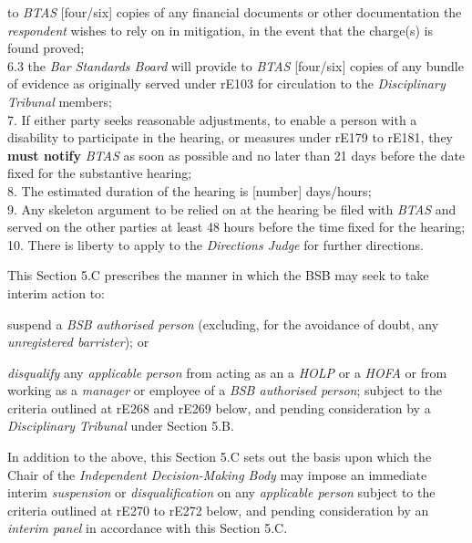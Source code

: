 to \emph{BTAS} {[}four/six{]} copies of any financial documents or other
documentation the \emph{respondent }wishes to rely on in mitigation, in
the event that the charge(s) is found proved;\\
6.3 the \emph{Bar Standards Board }will provide
to \emph{BTAS }{[}four/six{]} copies of any bundle of evidence as
originally served under rE103 for circulation to the \emph{Disciplinary
Tribunal }members;\\
7. If either party seeks reasonable adjustments, to enable a person with
a disability to participate in the hearing, or measures under rE179 to
rE181, they  \textcolor{myred}{\textbf{must notify}} \emph{BTAS }as soon as possible and no later
than 21 days before the date fixed for the substantive hearing;\\
8. The estimated duration of the hearing is {[}number{]} days/hours;\\
9. Any skeleton argument to be relied on at the hearing be filed
with \emph{BTAS} and served on the other parties at least 48 hours
before the time fixed for the hearing;\\
10. There is liberty to apply to the \emph{Directions Judge }for further
directions.\\
\par
{}
This Section 5.C prescribes the manner in which the BSB may seek to take
interim action to:\\\nl \item suspend a \emph{BSB authorised person }(excluding, for the avoidance
of doubt, any \emph{unregistered barrister}); or\item \emph{disqualify} any \emph{applicable person} from acting as an
a \emph{HOLP} or a \emph{HOFA} or from working as a \emph{manager} or
employee of a \emph{BSB authorised person};\ln
subject to the criteria outlined at rE268 and rE269 below, and pending
consideration by a \emph{Disciplinary Tribunal} under Section 5.B.
\par
In addition to the above, this Section 5.C sets out the basis upon which
the Chair of the \emph{Independent Decision-Making Body} may impose an
immediate interim \emph{suspension} or \emph{disqualification} on
any \emph{applicable person} subject to the criteria outlined at rE270
to rE272 below, and pending consideration by an \emph{interim panel} in
accordance with this Section 5.C.\\
